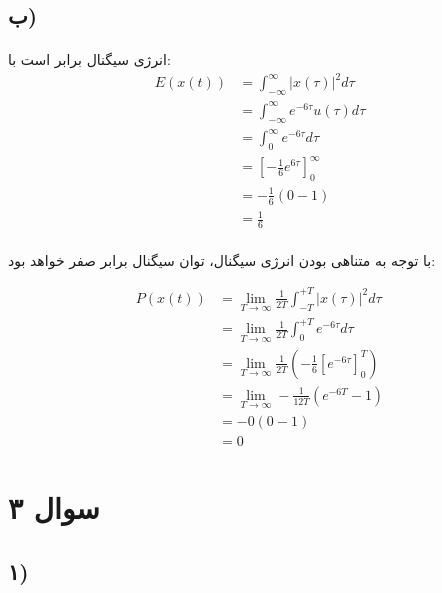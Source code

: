 \documentclass{article}
\begin{document}
	\subsection*{ب)}
	\paragraph*{}
	انرژی سیگنال برابر است با:
	\allowdisplaybreaks
	\begin{align*}
		E(x(t)) &= \int_{- \infty}^{\infty} |x(\tau)|^2 d\tau \\
		&= \int_{- \infty}^{\infty} e^{-6\tau} u(\tau) d \tau \\
		&= \int_{0}^{\infty} e^{-6 \tau} d \tau \\
		&= \left[- \frac{1}{6} e^{6 \tau} \right]^{\infty}_{0} \\
		&= -\frac{1}{6} \left(0 - 1\right) \\
		&= \frac{1}{6}
	\end{align*}

	\paragraph*{}
	با توجه به متناهی بودن انرژی سیگنال، توان سیگنال برابر صفر خواهد بود:

	\begin{align*}
		P(x(t)) &= \lim_{T \rightarrow \infty} \frac{1}{2T} \int_{-T}^{+T} |x(\tau)|^2 d\tau \\
		&= \lim_{T \rightarrow \infty} \frac{1}{2T} \int_{0}^{+T} e^{-6 \tau} d\tau \\
		&= \lim_{T \rightarrow \infty} \frac{1}{2T} (-\frac{1}{6} \left[e^{-6 \tau}\right]^{T}_{0}) \\
		&= \lim_{T \rightarrow \infty} -\frac{1}{12T} (e^{-6T} - 1) \\
		&= -0(0 - 1) \\
		&= 0
	\end{align*}

	\section*{سوال ۳}
	\subsection*{۱)}
\end{document}
